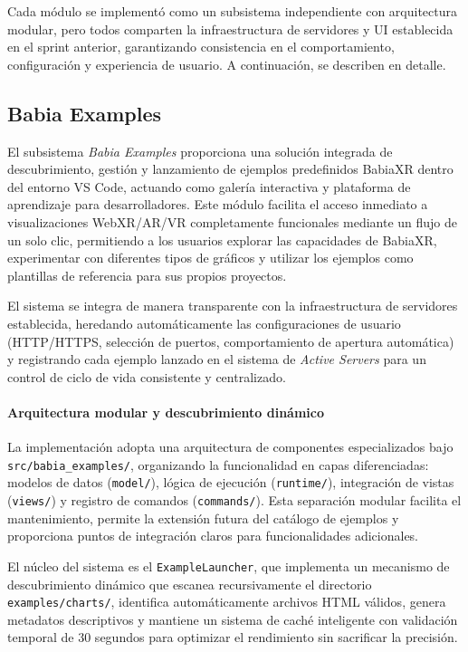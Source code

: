 \documentclass[a4paper, 12pt]{book}
\begin{document}
Cada módulo se implementó como un subsistema independiente con arquitectura modular, pero todos comparten la infraestructura de servidores y UI establecida en el sprint anterior, garantizando consistencia en el comportamiento, configuración y experiencia de usuario. A continuación, se describen en detalle.


\subsection{Babia Examples}
\label{sec:babia-examples}

El subsistema \emph{Babia Examples} proporciona una solución integrada de descubrimiento, gestión y lanzamiento de ejemplos predefinidos BabiaXR dentro del entorno VS Code, actuando como galería interactiva y plataforma de aprendizaje para desarrolladores. Este módulo facilita el acceso inmediato a visualizaciones WebXR/AR/VR completamente funcionales mediante un flujo de un solo clic, permitiendo a los usuarios explorar las capacidades de BabiaXR, experimentar con diferentes tipos de gráficos y utilizar los ejemplos como plantillas de referencia para sus propios proyectos.

El sistema se integra de manera transparente con la infraestructura de servidores establecida, heredando automáticamente las configuraciones de usuario (HTTP/HTTPS, selección de puertos, comportamiento de apertura automática) y registrando cada ejemplo lanzado en el sistema de \emph{Active Servers} para un control de ciclo de vida consistente y centralizado.

\paragraph{Arquitectura modular y descubrimiento dinámico}
La implementación adopta una arquitectura de componentes especializados bajo \texttt{src/babia\_examples/}, organizando la funcionalidad en capas diferenciadas: modelos de datos (\texttt{model/}), lógica de ejecución (\texttt{runtime/}), integración de vistas (\texttt{views/}) y registro de comandos (\texttt{commands/}). Esta separación modular facilita el mantenimiento, permite la extensión futura del catálogo de ejemplos y proporciona puntos de integración claros para funcionalidades adicionales.

El núcleo del sistema es el \texttt{ExampleLauncher}, que implementa un mecanismo de descubrimiento dinámico que escanea recursivamente el directorio \texttt{examples/charts/}, identifica automáticamente archivos HTML válidos, genera metadatos descriptivos y mantiene un sistema de caché inteligente con validación temporal de 30 segundos para optimizar el rendimiento sin sacrificar la precisión.
\end{document}
